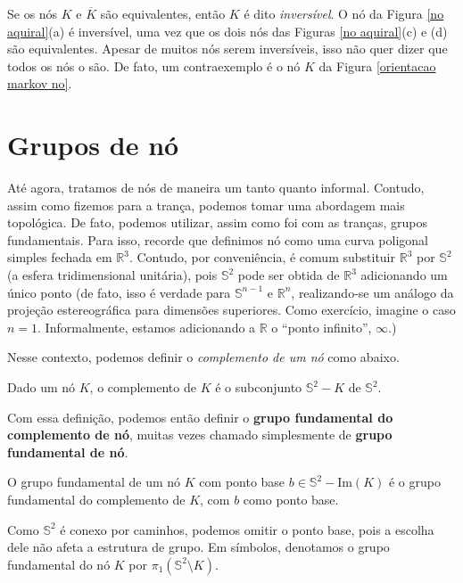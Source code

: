 	Se os nós $K$ e $\overline{K}$ são equivalentes, então $K$ é dito \textit{inversível}. 
	O nó da Figura \ref{no aquiral}(a) é inversível, uma vez que os dois nós das 
	Figuras \ref{no aquiral}(c) e (d) são equivalentes. Apesar de muitos nós serem inversíveis, 
	isso não quer dizer que todos os nós o são. De fato, um contraexemplo é o nó $K$ da 
	Figura \ref{orientacao markov no}.
	\section{Grupos de nó}
	Até agora, tratamos de nós de maneira um tanto quanto informal. Contudo, assim como 
	fizemos para a trança, podemos tomar uma abordagem mais topológica. De fato, podemos utilizar, 
	assim como foi com as tranças, grupos fundamentais. Para isso, recorde que definimos nó como 
	uma curva poligonal simples fechada em $\mathbb{R}^3$. Contudo, por conveniência, é 
	comum substituir $\mathbb{R}^3$ por $\mathbb{S}^2$ (a esfera tridimensional unitária), pois $\mathbb{S}^2$ 
	pode ser obtida de $\mathbb{R}^3$ adicionando um único ponto (de fato, isso é verdade para 
	$\mathbb{S}^{n-1}$ e $\mathbb{R}^n$, realizando-se um análogo da projeção estereográfica para 
	dimensões superiores. Como exercício, imagine o caso $n = 1$. Informalmente, estamos adicionando a
	$\mathbb{R}$ o ``ponto infinito'', $\infty$.)
	
	\par\vspace{0.3cm} Nesse contexto, podemos definir o \textit{complemento de um nó} como abaixo.
	\begin{definition}[Complemento de nó]
	\label{def complemento no}
		Dado um nó $K$, o complemento de $K$ é o subconjunto $\mathbb{S}^2 - K$ de $\mathbb{S}^2$.
	\end{definition}
	Com essa definição, podemos então definir o \textbf{grupo fundamental do complemento de nó}, 
	muitas vezes chamado simplesmente de \textbf{grupo fundamental de nó}.
	\begin{definition}
	\label{grupo fundamental de no}
		O grupo fundamental de um nó $K$ com ponto base $b\in\mathbb{S}^2 - \text{Im}(K)$ 
		é o grupo fundamental do complemento de $K$, com $b$ como ponto base.
	\end{definition}
	Como $\mathbb{S}^2$ é conexo por caminhos, podemos omitir o ponto base, pois a escolha dele 
	não afeta a estrutura de grupo. Em símbolos, denotamos o grupo fundamental do nó $K$ por
	$\pi_1(\mathbb{S}^2\setminus K)$.
	
